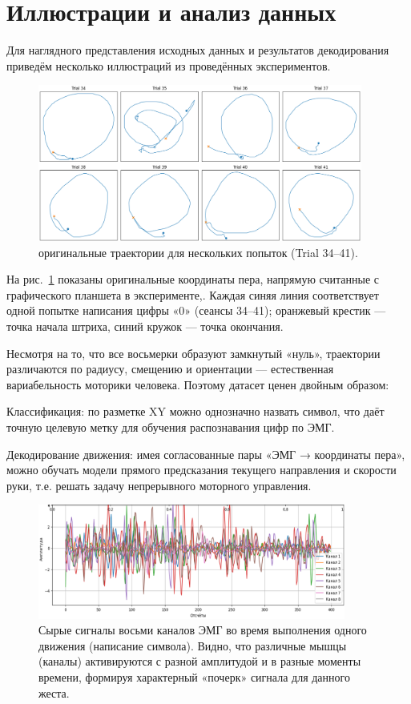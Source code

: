 \documentclass[12pt,a4paper]{article}
\begin{document}
\section{Иллюстрации и анализ данных}
Для наглядного представления исходных данных и результатов декодирования приведём несколько иллюстраций из проведённых экспериментов. 

\begin{figure}[h]
\centering
\includegraphics[width=0.95\textwidth]{img1.png}
\caption{оригинальные траектории для нескольких попыток (Trial 34--41).}
\label{fig:traj}
\end{figure}

На рис.~\ref{fig:traj} показаны оригинальные координаты пера, напрямую считанные с графического планшета в эксперименте,\cite{35}. Каждая синяя линия соответствует одной попытке написания цифры «0» (сеансы 34–41); оранжевый крестик — точка начала штриха, синий кружок — точка окончания.

Несмотря на то, что все восьмерки образуют замкнутый «нуль», траектории различаются по радиусу, смещению и ориентации — естественная вариабельность моторики человека. Поэтому датасет ценен двойным образом:

Классификация: по разметке XY можно однозначно назвать символ, что даёт точную целевую метку для обучения распознавания цифр по ЭМГ.

Декодирование движения: имея согласованные пары «ЭМГ → координаты пера», можно обучать модели прямого предсказания текущего направления и скорости руки, т.е. решать задачу непрерывного моторного управления.

\begin{figure}[h]
\centering
\includegraphics[width=0.9\textwidth]{img2.png}
\caption{Сырые сигналы восьми каналов ЭМГ во время выполнения одного движения (написание символа). Видно, что различные мышцы (каналы) активируются с разной амплитудой и в разные моменты времени, формируя характерный «почерк» сигнала для данного жеста.}
\label{fig:raw_emg}
\end{figure}
\end{document}

